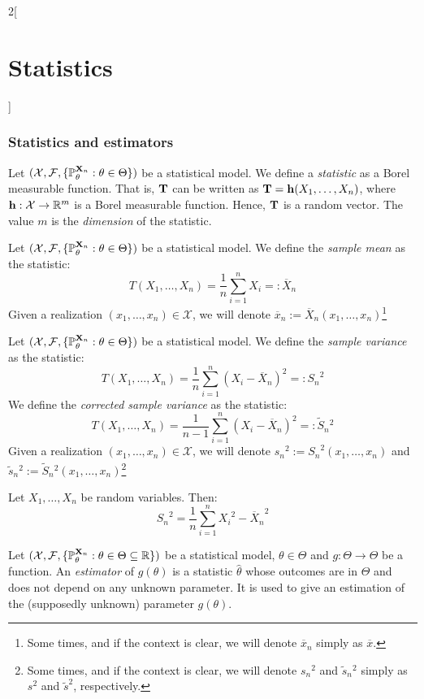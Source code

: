 \documentclass[../../../main.tex]{subfiles}
\begin{document}
\begin{multicols}{2}[\section{Statistics}]
  \subsubsection{Statistics and estimators}
  \begin{definition}[Statistic]
    Let $(\mathcal{X},\mathcal{F},\{\mathbb{P}_\theta^{\boldsymbol{\mathrm{X}}_n}:\theta\in\Theta\})$ be a statistical model. We define a \emph{statistic} as a Borel measurable function. That is, $\boldsymbol{\mathrm{T}}$ can be written as $\boldsymbol{\mathrm{T}}=\boldsymbol{\mathrm{h}}(X_1,\ldots,X_n)$, where $\boldsymbol{\mathrm{h}}:\mathcal{X}\rightarrow\mathbb{R}^m$ is a Borel measurable function. Hence, $\boldsymbol{\mathrm{T}}$ is a random vector. The value $m$ is the \emph{dimension} of the statistic.
  \end{definition}
  \begin{definition}
    Let $(\mathcal{X},\mathcal{F},\{\mathbb{P}_\theta^{\boldsymbol{\mathrm{X}}_n}:\theta\in\Theta\})$ be a statistical model. We define the \emph{sample mean} as the statistic: $$T(X_1,\ldots,X_n)=\frac{1}{n}\sum_{i=1}^nX_i=:\overline{X}_n$$
    Given a realization $(x_1,\ldots,x_n)\in\mathcal{X}$, we will denote $\overline{x}_n:=\overline{X}_n(x_1,\ldots,x_n)$\footnote{Some times, and if the context is clear, we will denote $\overline{x}_n$ simply as $\overline{x}$.}
  \end{definition}
  \begin{definition}
    Let $(\mathcal{X},\mathcal{F},\{\mathbb{P}_\theta^{\boldsymbol{\mathrm{X}}_n}:\theta\in\Theta\})$ be a statistical model. We define the \emph{sample variance} as the statistic: $$T(X_1,\ldots,X_n)=\frac{1}{n}\sum_{i=1}^n{(X_i-\overline{X}_n)}^2=:{S_n}^2$$ We define the \emph{corrected sample variance} as the statistic:
    $$T(X_1,\ldots,X_n)=\frac{1}{n-1}\sum_{i=1}^n{(X_i-\overline{X}_n)}^2=:\tilde{S}_n{}^2$$
    Given a realization $(x_1,\ldots,x_n)\in\mathcal{X}$, we will denote ${s_n}^2:={S_n}^2(x_1,\ldots,x_n)$ and $\tilde{s}_n{}^2:=\tilde{S}_n{}^2(x_1,\ldots,x_n)$\footnote{Some times, and if the context is clear, we will denote ${s_n}^2$ and $\tilde{s}_n{}^2$ simply as $s^2$ and $\tilde{s}^2$, respectively.}
  \end{definition}
  \begin{proposition}
    Let $X_1,\ldots,X_n$ be random variables. Then: $${S_n}^2=\frac{1}{n}\sum_{i=1}^n{X_i}^2-{\overline{X}_n}^2$$
  \end{proposition}
  \begin{definition}
    Let $(\mathcal{X},\mathcal{F},\{\mathbb{P}_{\theta}^{\boldsymbol{\mathrm{X}}_n}:{\theta}\in\Theta\subseteq \mathbb{R}\})$ be a statistical model, ${\theta} \in\Theta$ and $g:\Theta\rightarrow\Theta$ be a function. An \emph{estimator} of $g({\theta})$ is a statistic ${\hat\theta}$ whose outcomes are in $\Theta$ and does not depend on any unknown parameter. It is used to give an estimation of the (supposedly unknown) parameter $g({\theta})$.
  \end{definition}

\end{multicols}
\end{document}
